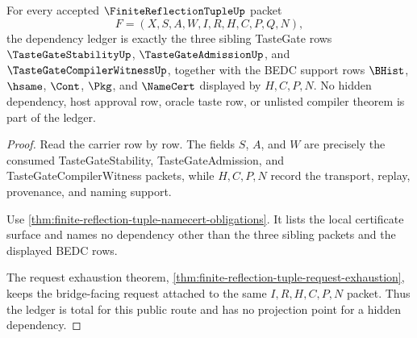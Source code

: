 \begin{theorem}
\label{thm:finite-reflection-tuple-dependency-ledger-totality}
For every accepted $\FiniteReflectionTupleUp$ packet
$$
F=(X,S,A,W,I,R,H,C,P,Q,N),
$$
the dependency ledger is exactly the three sibling TasteGate rows $\TasteGateStabilityUp$, $\TasteGateAdmissionUp$, and $\TasteGateCompilerWitnessUp$, together with the BEDC support rows $\BHist$, $\hsame$, $\Cont$, $\Pkg$, and $\NameCert$ displayed by $H,C,P,N$. No hidden dependency, host approval row, oracle taste row, or unlisted compiler theorem is part of the ledger.
\end{theorem}
\begin{proof}
Read the carrier row by row. The fields $S$, $A$, and $W$ are precisely the consumed TasteGateStability, TasteGateAdmission, and TasteGateCompilerWitness packets, while $H,C,P,N$ record the transport, replay, provenance, and naming support.

Use \autoref{thm:finite-reflection-tuple-namecert-obligations}. It lists the local certificate surface and names no dependency other than the three sibling packets and the displayed BEDC rows.

The request exhaustion theorem, \autoref{thm:finite-reflection-tuple-request-exhaustion}, keeps the bridge-facing request attached to the same $I,R,H,C,P,N$ packet. Thus the ledger is total for this public route and has no projection point for a hidden dependency.
\end{proof}

